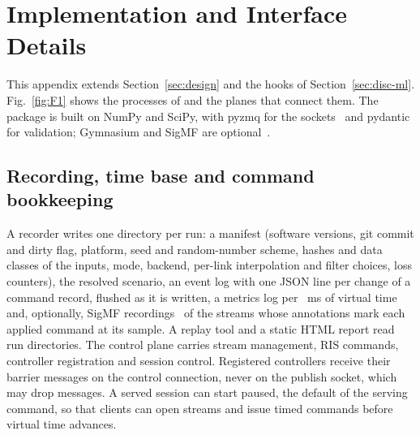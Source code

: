 \section{Implementation and Interface Details}\label{app:interfaces}

This appendix extends Section~\ref{sec:design} and the hooks of Section~\ref{sec:disc-ml}.
Fig.~\ref{fig:F1} shows the processes of \sremu{} and the planes that connect
them. The package is built on NumPy and SciPy, with pyzmq for the
sockets~\cite{ZeroMQ} and pydantic for validation; Gymnasium and SigMF are
optional~\cite{Towers2024Gymnasium,SigMF}.

\begin{figure}[t]
\centering
{}
\end{figure}

\subsection{Recording, time base and command bookkeeping}
A recorder writes one directory per run: a manifest (software versions,
git commit and dirty flag, platform, seed and random-number scheme, hashes and data classes
of the inputs, mode, backend, per-link interpolation and filter choices, loss counters), the
resolved scenario, an event log with one JSON line per change of a command record, flushed as
it is written, a metrics log per \numMetricsWindowMs~ms of virtual time and, optionally,
SigMF recordings~\cite{SigMF} of the streams whose annotations mark each applied command at
its sample. A replay tool and a static HTML report read run directories.
The control plane carries stream management, RIS commands, controller
registration and session control. Registered controllers receive their barrier messages on
the control connection, never on the publish socket, which may drop messages. A served
session can start paused, the default of the serving command, so that clients can open
streams and issue timed commands before virtual time advances.

